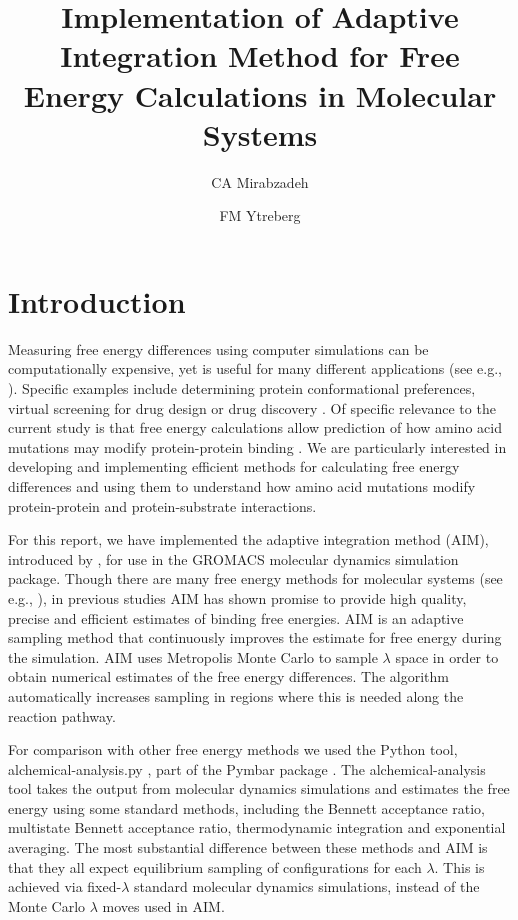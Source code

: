 \documentclass[fleqn,10pt,lineno]{wlpeerj} %
\title{Implementation of Adaptive Integration Method for Free Energy Calculations in Molecular Systems}
\author[1]{CA Mirabzadeh}
\author[2]{FM Ytreberg}
\affil[1,2]{Department of Physics, University of Idaho, Moscow ID}
\begin{document}
\flushbottom
\maketitle
\thispagestyle{empty}

\section*{Introduction} \label{introduction}

Measuring free energy differences using computer simulations can be computationally expensive, yet is useful for many different applications (see e.g., \cite{SteinBrecher2010,Chodera2011a,Mobley2013,Zhan2013,Miller2014,Petukh2015,Zhan2015,Wichman2016,Cournia2017,Hossain2019, Aminpour2019}). Specific examples include determining protein conformational preferences, virtual screening for drug design or drug discovery \citep{SteinBrecher2010, Chodera2011a, Zhan2015, Aminpour2019}. Of specific relevance to the current study is that free energy calculations allow prediction of how amino acid mutations may modify protein-protein binding \citep{Zhan2013, Miller2014, Petukh2015, Wichman2016}. We are particularly interested in developing and implementing efficient methods for calculating free energy differences and using them to understand how amino acid mutations modify protein-protein and protein-substrate interactions. 

For this report, we have implemented the adaptive integration method (AIM), introduced by \cite{Fasnacht2004}, for use in the GROMACS \citep{Berendsen1995} molecular dynamics simulation package. Though there are many free energy methods for molecular systems (see e.g., \cite{Lyubartsev1996,Goncalves2004, Kofke2005, Shirts2007, Chodera2011, Klimovich2015}), in previous studies AIM has shown promise to provide high quality, precise and efficient estimates of binding free energies\citep{Ytreberg2006, Kaus2014}. AIM is an adaptive sampling method that continuously improves the estimate for free energy during the simulation. AIM uses Metropolis Monte Carlo to sample $\lambda$ space in order to obtain numerical estimates of the free energy differences. The algorithm automatically increases sampling in regions where this is needed along the reaction pathway.

For comparison with other free energy methods we used the Python tool, alchemical-analysis.py \citep{Klimovich2015}, part of the Pymbar package \citep{Shirts2008}. The alchemical-analysis tool takes the output from molecular dynamics simulations and estimates the free energy using some standard methods, including the Bennett acceptance ratio, multistate Bennett acceptance ratio, thermodynamic integration and exponential averaging. 
The most substantial difference between these methods and AIM is that they all expect equilibrium sampling of configurations for each $\lambda$. This is achieved via fixed-$\lambda$ standard molecular dynamics simulations, instead of the Monte Carlo $\lambda$ moves used in AIM.
\end{document}
